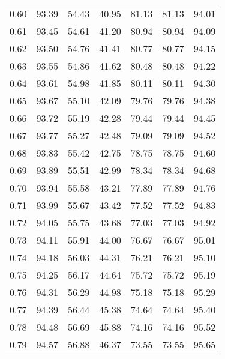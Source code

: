 \begin{tabular}{|c|c|c|c|c|c|c|}
      0.60 &     93.39 &     54.43 &      40.95 &   81.13 &      81.13 &         94.01 \\
      0.61 &     93.45 &     54.61 &      41.20 &   80.94 &      80.94 &         94.09 \\
      0.62 &     93.50 &     54.76 &      41.41 &   80.77 &      80.77 &         94.15 \\
      0.63 &     93.55 &     54.86 &      41.62 &   80.48 &      80.48 &         94.22 \\
      0.64 &     93.61 &     54.98 &      41.85 &   80.11 &      80.11 &         94.30 \\
      0.65 &     93.67 &     55.10 &      42.09 &   79.76 &      79.76 &         94.38 \\
      0.66 &     93.72 &     55.19 &      42.28 &   79.44 &      79.44 &         94.45 \\
      0.67 &     93.77 &     55.27 &      42.48 &   79.09 &      79.09 &         94.52 \\
      0.68 &     93.83 &     55.42 &      42.75 &   78.75 &      78.75 &         94.60 \\
      0.69 &     93.89 &     55.51 &      42.99 &   78.34 &      78.34 &         94.68 \\
      0.70 &     93.94 &     55.58 &      43.21 &   77.89 &      77.89 &         94.76 \\
      0.71 &     93.99 &     55.67 &      43.42 &   77.52 &      77.52 &         94.83 \\
      0.72 &     94.05 &     55.75 &      43.68 &   77.03 &      77.03 &         94.92 \\
      0.73 &     94.11 &     55.91 &      44.00 &   76.67 &      76.67 &         95.01 \\
      0.74 &     94.18 &     56.03 &      44.31 &   76.21 &      76.21 &         95.10 \\
      0.75 &     94.25 &     56.17 &      44.64 &   75.72 &      75.72 &         95.19 \\
      0.76 &     94.31 &     56.29 &      44.98 &   75.18 &      75.18 &         95.29 \\
      0.77 &     94.39 &     56.44 &      45.38 &   74.64 &      74.64 &         95.40 \\
      0.78 &     94.48 &     56.69 &      45.88 &   74.16 &      74.16 &         95.52 \\
      0.79 &     94.57 &     56.88 &      46.37 &   73.55 &      73.55 &         95.65 \\

\end{tabular}
